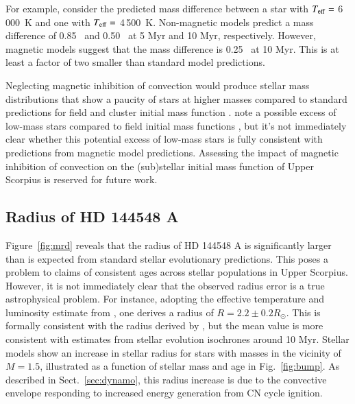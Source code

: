 \documentclass{aa}
\begin{document}
For example, consider the predicted mass difference between a star with $T_{\rm eff} = $ 6\,000~K and one with $T_{\rm eff} = $ 4\,500~K. Non-magnetic models predict a mass difference of 0.85 \msun\ and 0.50 \msun\ at 5 Myr and 10 Myr, respectively. However, magnetic models suggest that the mass difference is 0.25 \msun\ at 10 Myr. This is at least a factor of two smaller than standard model predictions.

Neglecting magnetic inhibition of convection would produce stellar mass distributions that show a paucity of stars at higher masses compared to standard predictions for field and cluster initial mass function \citep[e.g.,][]{Salpeter1955, Kroupa2002, Chabrier2003}. \citet{Preibisch2002} note a possible excess of low-mass stars compared to field initial mass functions \citep{Scalo1998, Kroupa2002}, but it's not immediately clear whether this potential excess of low-mass stars is fully consistent with predictions from magnetic model predictions. Assessing the impact of magnetic inhibition of convection on the (sub)stellar initial mass function of Upper Scorpius is reserved for future work.


\subsection{Radius of HD 144548 A}
\label{sec:radius}
Figure~\ref{fig:mrd} reveals that the radius of HD 144548 A is significantly larger than is expected from standard stellar evolutionary predictions. This poses a problem to claims of consistent ages across stellar populations in Upper Scorpius. However, it is not immediately clear that the observed radius error is a true astrophysical problem. For instance, adopting the effective temperature and luminosity estimate from \citet{Pecaut2012}, one derives a radius of $R = 2.2 \pm 0.2 R_{\odot}$. This is formally consistent with the radius derived by \citep{Alonso2015}, but the mean value is more consistent with estimates from stellar evolution isochrones around 10 Myr. Stellar models show an increase in stellar radius for stars with masses in the vicinity of $M = 1.5$\msun, illustrated as a function of stellar mass and age in Fig.\ \ref{fig:bump}. As described in Sect.\ \ref{sec:dynamo}, this radius increase is due to the convective envelope responding to increased energy generation from CN cycle ignition.
\end{document}

